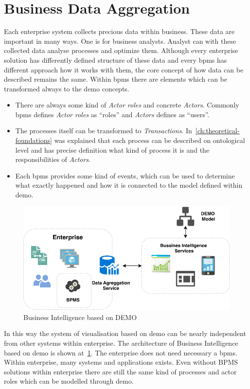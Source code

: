 \section{Business Data Aggregation}
Each enterprise system collects precious data within business. These data are important in many ways. One is for business analysts. Analyst can with these collected data analyse processes and optimize them. Although every enterprise solution has differently defined structure of these data and every \gls{bpms} has different approach how it works with them, the core concept of how data can be described remains the same. 
Within \gls{bpms} there are elements which can be transformed always to the \gls{demo} concepts.
\begin{itemize}
\item There are always some kind of \textit{Actor roles} and concrete \textit{Actors}. Commonly \gls{bpms} defines \textit{Actor roles} as ``roles'' and \textit{Actors} defines as ``users''.
\item The processes itself can be transformed to \textit{Transactions}. In~\cref{ch:theoretical-foundations} was explained that each process can be described on ontological level and has precise definition what kind of process it is and the responsibilities of \textit{Actors}.
\item Each \gls{bpms} provides some kind of events, which can be used to determine what exactly happened and how it is connected to the model defined within \gls{demo}.
\end{itemize}

\begin{figure}[ht!]
  \centering
  \includegraphics[width=12cm,keepaspectratio]{img/bi-demo-overview}
  \caption{Business Intelligence based on DEMO}
  \label{fig:bi-demo-overview}
\end{figure}    

In this way the system of visualisation based on \gls{demo} can be nearly independent from other systems within enterprise. The architecture of Business Intelligence based on \gls{demo} is shown at~\cref{fig:bi-demo-overview}. The enterprise does not need necessary a \gls{bpms}. Within enterprise, many systems and applications exists. Even without BPMS solutions within enterprise there are still the same kind of processes and actor roles which can be modelled through \gls{demo}.

